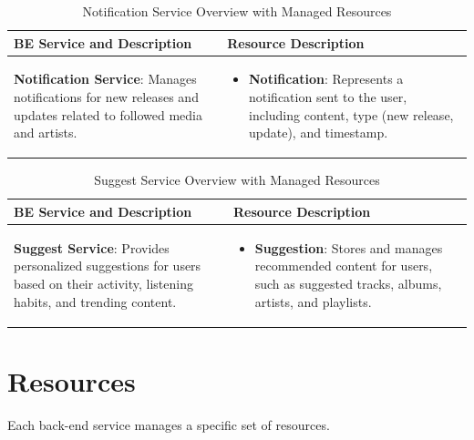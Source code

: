 \documentclass[a4paper,12pt]{article}
\begin{document}
\begin{table}[H]
    \centering
    \renewcommand{\arraystretch}{1.5}
    \begin{tabular}{|>{\centering\arraybackslash}m{4cm}|m{10cm}|}
    \hline
    \textbf{BE Service and Description} & \textbf{Resource Description} \\
    \hline
    \textbf{Notification Service}: Manages notifications for new releases and updates related to followed media and artists. &
    \begin{itemize}[left=0pt]
        \item \textbf{Notification}: Represents a notification sent to the user, including content, type (new release, update), and timestamp.
    \end{itemize} \\
    \hline
    \end{tabular}
    \caption{Notification Service Overview with Managed Resources}
\end{table}

\begin{table}[H]
    \centering
    \renewcommand{\arraystretch}{1.5}
    \begin{tabular}{|>{\centering\arraybackslash}m{4cm}|m{10cm}|}
    \hline
    \textbf{BE Service and Description} & \textbf{Resource Description} \\
    \hline
    \textbf{Suggest Service}: Provides personalized suggestions for users based on their activity, listening habits, and trending content. &
    \begin{itemize}[left=0pt]
        \item \textbf{Suggestion}: Stores and manages recommended content for users, such as suggested tracks, albums, artists, and playlists.
    \end{itemize} \\
    \hline
    \end{tabular}
    \caption{Suggest Service Overview with Managed Resources}
\end{table}

 \clearpage

\section{Resources}
Each back-end service manages a specific set of resources. 
\end{document}
